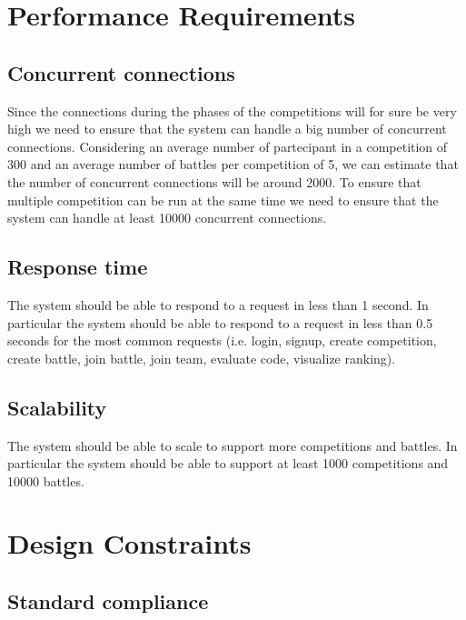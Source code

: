 \newpage

\section{Performance Requirements}
\label{s:Performance_requirements}%

\subsection*{Concurrent connections}
\label{ss:Concurrent_connections}%

Since the connections during the phases of the competitions will for sure be very high we need to ensure that the system can handle a big number of concurrent connections. Considering an average number of partecipant in a competition of 300 and an average number of battles per competition of 5, we can estimate that the number of concurrent connections will be around 2000. To ensure that multiple competition can be run at the same time we need to ensure that the system can handle at least 10000 concurrent connections.

\subsection*{Response time}
\label{ss:Response_time}%

The system should be able to respond to a request in less than 1 second. In particular the system should be able to respond to a request in less than 0.5 seconds for the most common requests (i.e. login, signup, create competition, create battle, join battle, join team, evaluate code, visualize ranking).

\subsection*{Scalability}
\label{ss:Scalability}%

The system should be able to scale to support more competitions and battles. In particular the system should be able to support at least 1000 competitions and 10000 battles.



\section{Design Constraints}
\label{s:Design_constraints}%

\subsection{Standard compliance}
\label{ss:Standard_compliance}%

